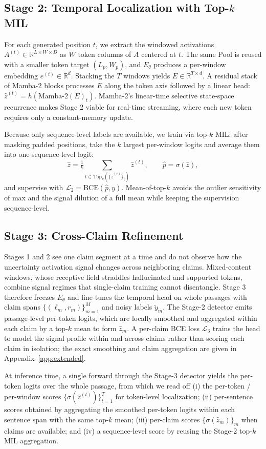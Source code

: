 \subsection{Stage 2: Temporal Localization with Top-$k$ MIL}
\label{sec:temporal_head}

For each generated position $t$, we extract the windowed activations
$A^{(t)} \in \mathbb{R}^{L \times W \times D}$ as $W$ token
columns of $A$ centered at $t$. The same Pool is reused with a
smaller token target $(L_p, W_p)$, and $E_\theta$ produces a
per-window embedding $e^{(t)} \in \mathbb{R}^{d}$. Stacking the $T$
windows yields $E \in \mathbb{R}^{T \times d}$. A residual stack of
Mamba-2 blocks processes $E$ along the token axis followed by a
linear head:
$\hat{z}^{(t)} = h(\mathrm{Mamba\text{-}2}(E)_t)$.
Mamba-2's linear-time selective state-space recurrence makes Stage 2
viable for real-time streaming, where each new token requires only a
constant-memory update.

Because only sequence-level labels are
available, we train via top-$k$ MIL: after masking padded positions,
take the $k$ largest per-window logits and average them into one
sequence-level logit:
\begin{equation}
\hat{z} = \tfrac{1}{k}\!\!\!\sum_{t \in \mathrm{Top}_k(\{\hat{z}^{(t)}\}_t)}\!\!\!\hat{z}^{(t)}, \qquad \hat{p} = \sigma(\hat{z}),
\end{equation}
and supervise with $\mathcal{L}_{2} = \mathrm{BCE}(\hat{p}, y)$.
Mean-of-top-$k$ avoids the outlier sensitivity of max and the signal
dilution of a full mean while keeping the supervision sequence-level.

\subsection{Stage 3: Cross-Claim Refinement}
\label{sec:stage3}

Stages 1 and 2 see one claim segment at a time and do not observe
how the uncertainty activation signal changes across neighboring
claims. Mixed-content windows, whose receptive field straddles
hallucinated and supported tokens, combine signal regimes that
single-claim training cannot disentangle. Stage 3 therefore freezes
$E_\theta$ and fine-tunes the temporal head on whole passages with
claim spans $\{(\ell_m, r_m)\}_{m=1}^{M}$ and noisy labels
$\tilde{y}_m$. The Stage-2 detector emits passage-level per-token
logits, which are locally smoothed and aggregated within each claim
by a top-$k$ mean to form $\hat{z}_m$. A per-claim BCE loss
$\mathcal{L}_{3}$ trains the head to model the signal profile within
and across claims rather than scoring each claim in isolation; the
exact smoothing and claim aggregation are given in
Appendix~\ref{app:extended}.

At inference time, a single forward through the Stage-3 detector
yields the per-token logits over the whole passage, from which we
read off (i) the per-token / per-window scores
$\{\sigma(\hat{z}^{(t)})\}_{t=1}^{T}$ for token-level localization;
(ii) per-sentence scores obtained by aggregating the smoothed
per-token logits within each sentence span with the same top-$k$
mean; (iii) per-claim scores $\{\sigma(\hat{z}_m)\}_m$ when claims
are available; and (iv) a sequence-level score by reusing the
Stage-2 top-$k$ MIL aggregation.
